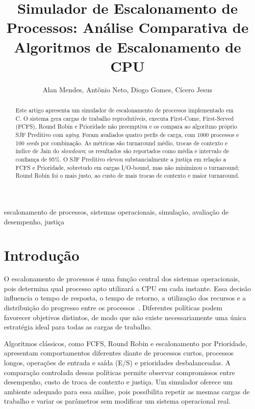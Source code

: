 \documentclass[conference]{IEEEtran}
\begin{document}
\title{Simulador de Escalonamento de Processos: Análise Comparativa de Algoritmos de Escalonamento de CPU}

\author{
Alan Mendes,
Antônio Neto,
Diogo Gomes,
Cícero Jesus
}

\maketitle

\begin{abstract}
Este artigo apresenta um simulador de escalonamento de processos implementado em C. O sistema gera cargas de trabalho reprodutíveis, executa First-Come, First-Served (FCFS), Round Robin e Prioridade não preemptiva e os compara ao algoritmo próprio SJF Preditivo com \textit{aging}. Foram avaliados quatro perfis de carga, com 1000 processos e 100 \textit{seeds} por combinação. As métricas são turnaround médio, trocas de contexto e índice de Jain do \textit{slowdown}; os resultados são reportados como média e intervalo de confiança de 95\%. O SJF Preditivo elevou substancialmente a justiça em relação a FCFS e Prioridade, sobretudo em cargas I/O-bound, mas não minimizou o turnaround; Round Robin foi o mais justo, ao custo de mais trocas de contexto e maior turnaround.
\end{abstract}

\begin{IEEEkeywords}
escalonamento de processos, sistemas operacionais, simulação, avaliação de desempenho, justiça
\end{IEEEkeywords}

\section{Introdução}

O escalonamento de processos é uma função central dos sistemas operacionais, pois determina qual processo apto utilizará a CPU em cada instante. Essa decisão influencia o tempo de resposta, o tempo de retorno, a utilização dos recursos e a distribuição do progresso entre os processos~\cite{silberschatz2018,tanenbaum2014}. Diferentes políticas podem favorecer objetivos distintos, de modo que não existe necessariamente uma única estratégia ideal para todas as cargas de trabalho.

Algoritmos clássicos, como FCFS, Round Robin e escalonamento por Prioridade, apresentam comportamentos diferentes diante de processos curtos, processos longos, operações de entrada e saída (E/S) e prioridades desbalanceadas. A comparação controlada dessas políticas permite observar compromissos entre desempenho, custo de troca de contexto e justiça. Um simulador oferece um ambiente adequado para essa análise, pois possibilita repetir as mesmas cargas de trabalho e variar os parâmetros sem modificar um sistema operacional real.
\end{document}
